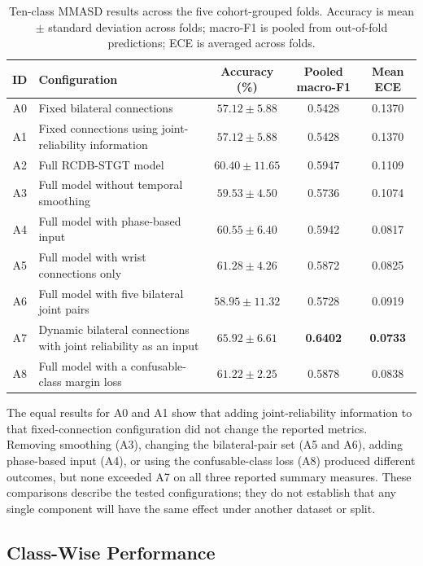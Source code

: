 \begin{table}[htbp]
\centering
\caption{Ten-class MMASD results across the five cohort-grouped folds. Accuracy is mean $\pm$ standard deviation across folds; macro-F1 is pooled from out-of-fold predictions; ECE is averaged across folds.}
\label{tab:rcdb_main_results}
\small
\begin{tabular}{|c|p{6.0cm}|c|c|c|}
\hline
\textbf{ID} & \textbf{Configuration} & \textbf{Accuracy (\%)} & \textbf{Pooled macro-F1} & \textbf{Mean ECE} \\
\hline
A0 & Fixed bilateral connections & $57.12 \pm 5.88$ & 0.5428 & 0.1370 \\
\hline
A1 & Fixed connections using joint-reliability information & $57.12 \pm 5.88$ & 0.5428 & 0.1370 \\
\hline
A2 & Full RCDB-STGT model & $60.40 \pm 11.65$ & 0.5947 & 0.1109 \\
\hline
A3 & Full model without temporal smoothing & $59.53 \pm 4.50$ & 0.5736 & 0.1074 \\
\hline
A4 & Full model with phase-based input & $60.55 \pm 6.40$ & 0.5942 & 0.0817 \\
\hline
A5 & Full model with wrist connections only & $61.28 \pm 4.26$ & 0.5872 & 0.0825 \\
\hline
A6 & Full model with five bilateral joint pairs & $58.95 \pm 11.32$ & 0.5728 & 0.0919 \\
\hline
A7 & Dynamic bilateral connections with joint reliability as an input & $\mathbf{65.92 \pm 6.61}$ & \textbf{0.6402} & \textbf{0.0733} \\
\hline
A8 & Full model with a confusable-class margin loss & $61.22 \pm 2.25$ & 0.5878 & 0.0838 \\
\hline
\end{tabular}
\end{table}

The equal results for A0 and A1 show that adding joint-reliability information to that fixed-connection configuration did not change the reported metrics. Removing smoothing (A3), changing the bilateral-pair set (A5 and A6), adding phase-based input (A4), or using the confusable-class loss (A8) produced different outcomes, but none exceeded A7 on all three reported summary measures. These comparisons describe the tested configurations; they do not establish that any single component will have the same effect under another dataset or split.

\subsection{Class-Wise Performance}

